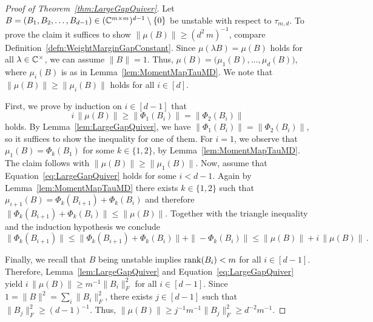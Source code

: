 \begin{proof}[Proof of Theorem~\ref{thm:LargeGapQuiver}]
	Let $B = (B_1,B_2,\ldots,B_{d-1}) \in (\mathbb C^{m \times m})^{d-1} \setminus \{0\}$ be unstable with respect to $\tau_{m,d}$. To prove the claim it suffices to show $\| \mu(B) \| \geq (d^2 \, m)^{-1}$, compare Definition~\ref{defn:WeightMarginGapConstant}.
	Since $\mu(\lambda B) = \mu(B)$ holds for all $\lambda \in \mathbb C^{\times}$, we can assume $\|B\| = 1$. Thus, $\mu(B) = \big( \mu_1(B),\ldots,\mu_d(B) \big)$, where $\mu_i(B)$ is as in Lemma~\ref{lem:MomentMapTauMD}. We note that $\| \mu(B) \| \geq \| \mu_i(B)\|$ holds for all $i \in [d]$.
	
	First, we prove by induction on $i \in [d-1]$ that
		\begin{equation}\label{eq:LargeGapQuiver}
			 i \, \| \mu(B) \| \geq \| \Phi_1(B_i) \| = \| \Phi_2(B_i) \| 
		\end{equation}
	holds. By Lemma~\ref{lem:LargeGapQuiver}, we have $\| \Phi_1(B_i) \| = \| \Phi_2(B_i) \|$, so it suffices to show the inequality for one of them. For $i=1$, we observe that $\mu_1(B) = \Phi_k(B_1)$ for some $k \in \{1,2\}$, by Lemma~\ref{lem:MomentMapTauMD}. The claim follows with $\| \mu(B) \| \geq \|\mu_1(B)\|$. Now, assume that Equation~\eqref{eq:LargeGapQuiver} holds for some $i < d-1$. Again by Lemma~\ref{lem:MomentMapTauMD} there exists $k \in \{1,2\}$ such that $\mu_{i+1}(B) = \Phi_k(B_{i+1}) + \Phi_k(B_{i})$ and therefore $\| \Phi_k(B_{i+1}) + \Phi_k(B_{i}) \| \leq \| \mu(B) \|$. Together with the triangle inequality and the induction hypothesis we conclude
		\[ \| \Phi_k(B_{i+1}) \| \leq \| \Phi_k(B_{i+1}) + \Phi_k(B_{i}) \| + \| - \Phi_k(B_i) \|
		\leq \| \mu(B) \| + i \, \|\mu(B)\| \, .  \]
	
	Finally, we recall that $B$ being unstable implies $\operatorname{rank}(B_i) < m$ for all $i \in [d-1]$. Therefore, Lemma~\ref{lem:LargeGapQuiver} and Equation~\eqref{eq:LargeGapQuiver} yield  $i \, \| \mu(B) \| \geq m^{-1} \|B_i\|^2_F$ for all $i \in [d-1]$. Since $1 = \|B\|^2 = \sum_i \|B_i\|^2_F$, there exists $j \in [d-1]$ such that $\|B_j\|^2_F \geq (d-1)^{-1}$. Thus, $\| \mu(B)\| \geq j^{-1} m^{-1} \|B_j\|^2_F \geq d^{-2} m^{-1}$.
\end{proof}


















